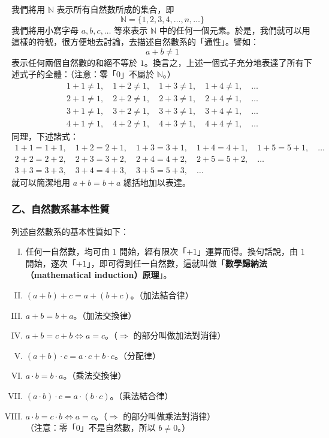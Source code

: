我們將用 $\mathbb{N}$ 表示所有自然數所成的集合，即
\begin{equation*}
  \mathbb{N} = \{1, 2, 3, 4, \dots, n, \dots\}
\end{equation*}
我們將用小寫字母 $a, b, c, \dots$ 等來表示 $\mathbb{N}$ 中的任何一個元素。於是，我們就可以用這樣的符號，很方便地去討論，去描述自然數系的「通性」。譬如：
\begin{equation*}
  a+b \neq 1
\end{equation*}
表示任何兩個自然數的和絕不等於 $1$。換言之，上述一個式子充分地表達了所有下述式子的全體：（注意：零「$0$」不屬於 $\mathbb{N}$。）
\begin{align*}
  1+1 \neq 1, \quad 1+2 \neq 1, \quad 1+3 \neq 1, \quad 1+4 \neq 1, \quad \dots \\
  2+1 \neq 1, \quad 2+2 \neq 1, \quad 2+3 \neq 1, \quad 2+4 \neq 1, \quad \dots \\
  3+1 \neq 1, \quad 3+2 \neq 1, \quad 3+3 \neq 1, \quad 3+4 \neq 1, \quad \dots \\
  4+1 \neq 1, \quad 4+2 \neq 1, \quad 4+3 \neq 1, \quad 4+4 \neq 1, \quad \dots
\end{align*}
同理，下述諸式：
\begin{align*}
  1+1 = 1+1, \quad 1+2 = 2+1, \quad 1+3 = 3+1, \quad 1+4 = 4+1, \quad 1+5 = 5+1, \quad \dots \\
  2+2 = 2+2, \quad 2+3 = 3+2, \quad 2+4 = 4+2, \quad 2+5 = 5+2, \quad \dots \\
  3+3 = 3+3, \quad 3+4 = 4+3, \quad 3+5 = 5+3, \quad \dots
\end{align*}
就可以簡潔地用 $a+b = b+a$ 總括地加以表達。

\subsubsection*{乙、自然數系基本性質}\label{subsec:nat_axioms}

列述自然數系的基本性質如下：
\begin{enumerate}[I.]
  \item 任何一自然數，均可由 $1$ 開始，經有限次「$+1$」運算而得。換句話說，由 $1$ 開始，逐次「$+1$」，即可得到任一自然數，這就叫做「\textbf{數學歸納法（mathematical induction）原理}」。
  \item $(a+b)+c = a+(b+c)$。（加法結合律）
  \item $a+b = b+a$。（加法交換律）
  \item $a+b = c+b \iff a = c$。（$\Rightarrow$ 的部分叫做加法對消律）
  \item $(a+b) \cdot c = a \cdot c + b \cdot c$。（分配律）
  \item $a \cdot b = b \cdot a$。（乘法交換律）
  \item $(a \cdot b) \cdot c = a \cdot (b \cdot c)$。（乘法結合律）
  \item $a \cdot b = c \cdot b \iff a = c$。（$\Rightarrow$ 的部分叫做乘法對消律）\\
  （注意：零「$0$」不是自然數，所以 $b \neq 0$。）
\end{enumerate}

